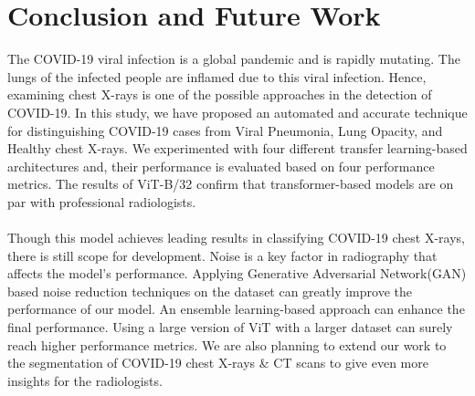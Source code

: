 \documentclass[conference]{IEEEtran}
\begin{document}
\section{\normalsize{Conclusion and Future Work}}
    The COVID-19 viral infection is a global pandemic and is rapidly mutating. The lungs of the infected people are inflamed due to this viral infection. Hence, examining chest X-rays is one of the possible approaches in the detection of COVID-19. In this study, we have proposed an automated and accurate technique for distinguishing COVID-19 cases from Viral Pneumonia, Lung Opacity, and Healthy chest X-rays. We experimented with four different transfer learning-based architectures and, their performance is evaluated based on four performance metrics. The results of ViT-B/32\cite{dosovitskiy2021image} confirm that transformer-based models are on par with professional radiologists.\\\\
    Though this model achieves leading results in classifying COVID-19 chest X-rays, there is still scope for development. Noise is a key factor in radiography that affects the model's performance. Applying Generative Adversarial Network(GAN) based noise reduction \cite{Sun2018} techniques on the dataset can greatly improve the performance of our model. An ensemble learning-based approach can enhance the final performance. Using a large version of ViT\cite{dosovitskiy2021image} with a larger dataset can surely reach higher performance metrics. We are also planning to extend our work to the segmentation of COVID-19 chest X-rays \& CT scans to give even more insights for the radiologists.\\\\


\ifCLASSOPTIONcaptionsoff
  \newpage
\fi





\balance
\printbibliography
\end{document}
